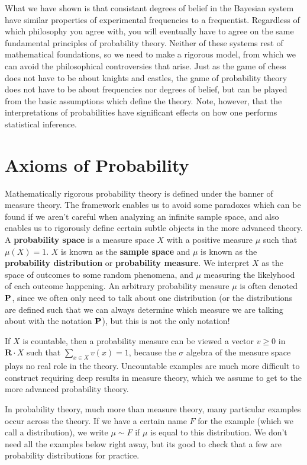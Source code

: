 What we have shown is that consistant degrees of belief in the Bayesian system have similar properties of experimental frequencies to a frequentist. Regardless of which philosophy you agree with, you will eventually have to agree on the same fundamental principles of probability theory. Neither of these systems rest of mathematical foundations, so we need to make a rigorous model, from which we can avoid the philosophical controversies that arise. Just as the game of chess does not have to be about knights and castles, the game of probability theory does not have to be about frequencies nor degrees of belief, but can be played from the basic assumptions which define the theory. Note, however, that the interpretations of probabilities have significant effects on how one performs statistical inference.

\section{Axioms of Probability}

Mathematically rigorous probability theory is defined under the banner of measure theory. The framework enables us to avoid some paradoxes which can be found if we aren't careful when analyzing an infinite sample space, and also enables us to rigorously define certain subtle objects in the more advanced theory. A {\bf probability space} is a measure space $X$ with a positive measure $\mu$ such that $\mu(X) = 1$. $X$ is known as the {\bf sample space} and $\mu$ is known as the {\bf probability distribution} or {\bf probability measure}. We interpret $X$ as the space of outcomes to some random phenomena, and $\mu$ measuring the likelyhood of each outcome happening. An arbitrary probability measure $\mu$ is often denoted $\operatorname{\mathbf{P}}$, since we often only need to talk about one distribution (or the distributions are defined such that we can always determine which measure we are talking about with the notation $\operatorname{\mathbf{P}}$), but this is not the only notation!

If $X$ is countable, then a probability measure can be viewed a vector $v \geq 0$ in $\mathbf{R} \cdot X$ such that $\sum_{x \in X} v(x) = 1$, because the $\sigma$ algebra of the measure space plays no real role in the theory. Uncountable examples are much more difficult to construct requiring deep results in measure theory, which we assume to get to the more advanced probability theory.

In probability theory, much more than measure theory, many particular examples occur across the theory. If we have a certain name $F$ for the example (which we call a distribution), we write $\mu \sim F$ if $\mu$ is equal to this distribution. We don't need all the examples below right away, but its good to check that a few are probability distributions for practice.


